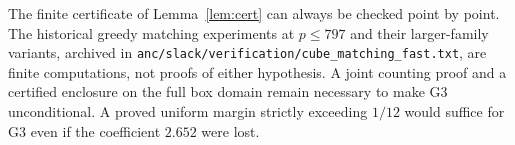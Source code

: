 \begin{remark}
The finite certificate of Lemma~\ref{lem:cert} can always be checked point by point.
The historical greedy matching experiments at $p\le797$ and their larger-family variants, archived in
\texttt{anc/slack/verification/cube\_matching\_fast.txt}, are finite computations, not proofs of either hypothesis.
A joint counting proof and a certified enclosure on the full box domain remain necessary to make G3 unconditional.
A proved uniform margin strictly exceeding $1/12$ would suffice for G3 even if the coefficient $2.652$ were lost.
\end{remark}
